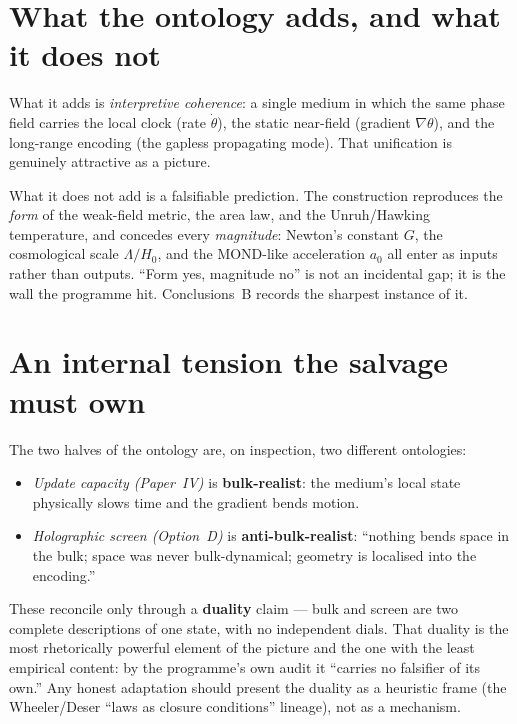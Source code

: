 \documentclass[11pt]{article}
\begin{document}
\section{What the ontology adds, and what it does not}

What it adds is \emph{interpretive coherence}: a single medium in which the same
phase field carries the local clock (rate $\dot\theta$), the static near-field
(gradient $\nabla\theta$), and the long-range encoding (the gapless propagating
mode). That unification is genuinely attractive as a picture.

What it does not add is a falsifiable prediction. The construction reproduces
the \emph{form} of the weak-field metric, the area law, and the Unruh/Hawking
temperature, and concedes every \emph{magnitude}: Newton's constant $G$, the
cosmological scale $\Lambda/H_0$, and the MOND-like acceleration $a_0$ all enter
as inputs rather than outputs. ``Form yes, magnitude no'' is not an incidental
gap; it is the wall the programme hit. Conclusions~B records the sharpest
instance of it.

\section{An internal tension the salvage must own}

The two halves of the ontology are, on inspection, two different ontologies:

\begin{itemize}[leftmargin=1.4em]
\item \emph{Update capacity (Paper~IV)} is \textbf{bulk-realist}: the medium's
  local state physically slows time and the gradient bends motion.
\item \emph{Holographic screen (Option~D)} is \textbf{anti-bulk-realist}:
  ``nothing bends space in the bulk; space was never bulk-dynamical; geometry is
  localised into the encoding.''
\end{itemize}

\noindent These reconcile only through a \textbf{duality} claim --- bulk and
screen are two complete descriptions of one state, with no independent dials.
That duality is the most rhetorically powerful element of the picture and the one
with the least empirical content: by the programme's own audit it ``carries no
falsifier of its own.'' Any honest adaptation should present the duality as a
heuristic frame (the Wheeler/Deser ``laws as closure conditions'' lineage), not
as a mechanism.
\end{document}
